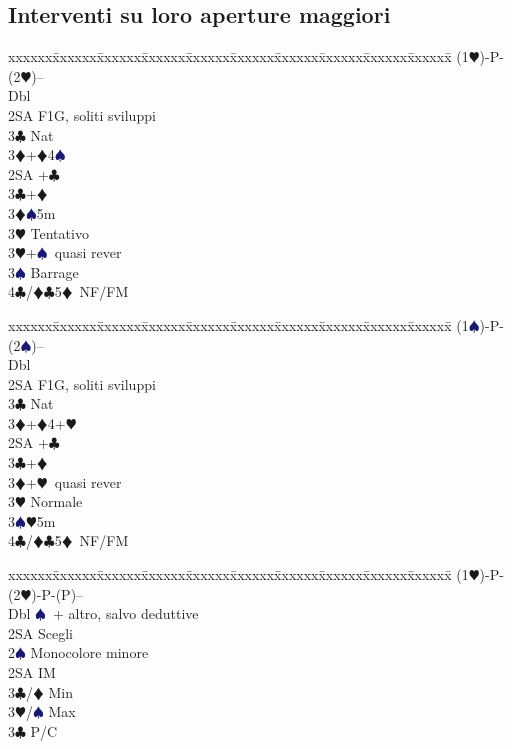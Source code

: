 \documentclass[a4paper,italian]{article}
\newcommand{\BC}{\textcolor{OliveGreen}{$\clubsuit$}}
\newcommand{\BD}{\textcolor{RedOrange}{$\vardiamondsuit$}}
\newcommand{\BH}{\textcolor{Red2}{$\varheartsuit${}}}
\newcommand{\BS}{\textcolor{MidnightBlue}{$\spadesuit${}}}
\newenvironment{bidtable}
{\begin{tabbing}

    xxxxxx\=xxxxxx\=xxxxxx\=xxxxxx\=xxxxxx\=xxxxxx\=xxxxxx\=xxxxxx\=xxxxxx\=xxxxxx\=\kill}
{\end{tabbing} }%
\begin{document}
\begin{multicols}{2}
    \subsection{Interventi su loro aperture maggiori}

    \begin{bidtable}
        (1\BH)-P-(2\BH)--\+\\
        Dbl\+\\
        2SA \> F1G, soliti sviluppi\\
        3\BC\> Nat\+\\
        3\BD {}+\BD4\BS \-\-\\
        2SA +\BC \\
        3\BC {}+\BD \\
        3\BD {}\BS 5m\+\\
        3\BH \> Tentativo\-\\
        3\BH {}+\BS\ quasi rever\\
        3\BS \> Barrage\\
        4\BC/\BD {}\BC 5\BD\ NF/FM
    \end{bidtable}
    \begin{bidtable}
        (1\BS)-P-(2\BS)--\+\\
        Dbl\+\\
        2SA \> F1G, soliti sviluppi\\
        3\BC\> Nat\+\\
        3\BD {}+\BD4+\BH \-\-\\
        2SA +\BC \\
        3\BC {}+\BD \\
        3\BD {}+\BH\ quasi rever\\
        3\BH \> Normale\\
        3\BS {}\BH 5m\\
        4\BC/\BD {}\BC 5\BD\ NF/FM
    \end{bidtable}
    \begin{bidtable}
        (1\BH)-P-(2\BH)-P-(P)--\+\\
        Dbl \BS\ + altro, salvo deduttive\\
        \>2SA Scegli\\
        2\BS \> Monocolore minore\+\\
        2SA \> IM\+\\
        3\BC/\BD \> Min\\
        3\BH/\BS \> Max\-\\
        3\BC \> P/C\-\\

\end{bidtable}
\end{multicols}
\end{document}
